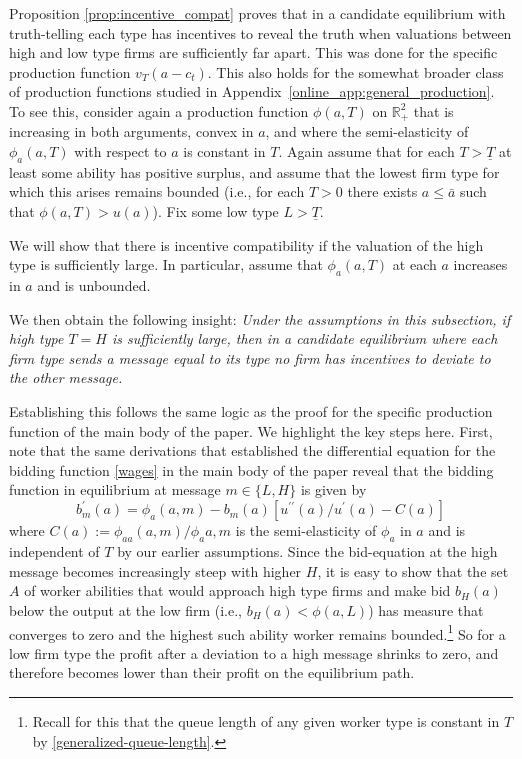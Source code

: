 \documentclass[12pt]{article}
\begin{document}
Proposition \ref{prop:incentive_compat} proves that in a candidate equilibrium with truth-telling each type has incentives to reveal the truth when valuations between high and low type firms are sufficiently far apart. This was done for the specific production function $v_T (a-c_t)$.
This also holds for the somewhat broader class of production functions studied in Appendix~\ref{online_app:general_production}. To see this, consider again a production function $\phi(a,T)$ on $\mathbb{R}^2_{+}$ that is increasing in both arguments, convex in $a$, and where the semi-elasticity of $\phi_a(a,T)$ with respect to $a$ is constant in $T$. Again assume that for each $T>\underline{T}$ at least some ability has positive surplus, and assume that the lowest firm type for which this arises remains bounded (i.e., for each $T>0$ there exists $a\leq \bar{a}$ such that $\phi(a,T)>u(a)$). Fix some low type $L>\underline{T}$. 

We will show that there is incentive compatibility if the valuation of the high type is sufficiently large. In particular, assume that $\phi_a(a,T)$ at each $a$ increases in $a$ and is unbounded. 

We then obtain the following insight: \textit{ Under the assumptions in this subsection, if high type $T=H$ is sufficiently large, then in a candidate equilibrium where each firm type sends a message equal to its type no firm has incentives to deviate to the other message.}

Establishing this follows the same logic as the proof for the specific production function of the main body of the paper. We highlight the key steps here. First, note that the same derivations that established the differential equation for the bidding function \eqref{wages} in the main body of the paper reveal that the bidding function in equilibrium at message $ m\in\{L,H \} $ is given by 
\begin{equation}
    b_{m}^{\prime }(a) = \phi_a(a,m) - b_{m}(a)\left[ u^{\prime \prime }(a)/u^{\prime }(a) - C(a) \right]
\end{equation}
where $C(a):=\phi_{aa}(a,m)/\phi_a{a,m}$ is the semi-elasticity of $\phi_a$ in $a$ and is independent of $T$ by our earlier assumptions. 
Since the bid-equation at the high message becomes increasingly steep with higher $H$, it is easy to show that the set $A$ of worker abilities that would approach high type firms and make bid $b_H(a)$ below the output at the low firm (i.e., $b_H(a)<\phi(a,L)$) has measure that converges to zero and the highest such ability worker remains bounded.\footnote{Recall for this that the queue length of any given worker type is constant in $T$ by \eqref{generalized-queue-length}.} So for a low firm type the profit after a deviation to a high message shrinks to zero, and therefore becomes lower than their profit on the equilibrium path.
\end{document}
